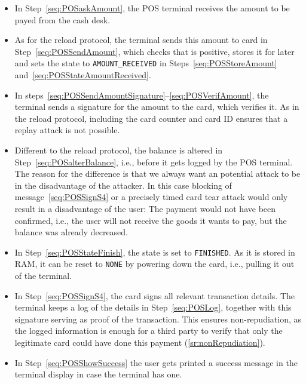 \documentclass{article}
\begin{document}
\begin{itemize}
    \item In Step~\ref{seq:POSaskAmount}, the POS terminal receives the amount to be payed from the cash desk.
    \item As for the reload protocol, the terminal sends this amount to card in Step~\ref{seq:POSSendAmount}, which checks that is positive, stores it for later and sets the state to \texttt{AMOUNT\_RECEIVED} in Steps~\ref{seq:POSStoreAmount} and~\ref{seq:POSStateAmountReceived}.

    \item In steps~\ref{seq:POSSendAmountSignature}--\ref{seq:POSVerifAmount}, the terminal sends a signature for the amount to the card, which verifies it.
          As in the reload protocol, including the card counter and card ID ensures that a replay attack is not possible.

    \item Different to the reload protocol, the balance is altered in Step~\ref{seq:POSalterBalance}, i.e., before it gets logged by the POS terminal.
          The reason for the difference is that we always want an potential attack to be in the disadvantage of the attacker.
          In this case blocking of message~\ref{seq:POSSignS4} or a precisely timed card tear attack would only result in a disadvantage of the user:
          The payment would not have been confirmed, i.e., the user will not receive the goods it wants to pay, but the balance was already decreased.

    \item In Step~\ref{seq:POSStateFinish}, the state is set to \texttt{FINISHED}.
          As it is stored in RAM, it can be reset to \texttt{NONE} by powering down the card, i.e., pulling it out of the terminal.

    \item In Step~\ref{seq:POSSignS4}, the card signs all relevant transaction details.
          The terminal keeps a log of the details in Step~\ref{seq:POSLog}, together with this signature serving as proof of the transaction.
          This ensures non-repudiation, as the logged information is enough for a third party to verify that only the legitimate card could have done this payment (\ref{sr:nonRepudiation}).

    \item In Step~\ref{seq:POSShowSuccess} the user gets printed a success message in the terminal display in case the terminal has one.
\end{itemize}
\end{document}
